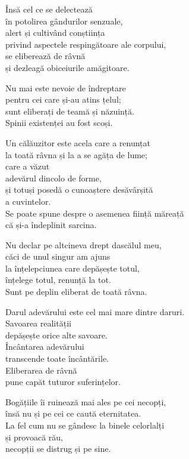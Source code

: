 Însă cel ce se delectează\\
în potolirea gândurilor senzuale,\\
alert și cultivând conștiința\\
privind aspectele respingătoare ale corpului,\\
se eliberează de râvnă\\
și dezleagă obiceiurile amăgitoare.


Nu mai este nevoie de îndreptare\\
pentru cei care și-au atins țelul;\\
sunt eliberați de teamă și năzuință.\\
Spinii existenței au fost scoși.


Un călăuzitor este acela care a renunțat\\
la toată râvna și la a se agăța de lume;\\
care a văzut\\
adevărul dincolo de forme,\\
și totuși posedă o cunoaștere desăvârșită\\
a cuvintelor.\\
Se poate spune despre o asemenea ființă măreață\\
că și-a îndeplinit sarcina.


Nu declar pe altcineva drept dascălul meu,\\
căci de unul singur am ajuns\\
la înțelepciunea care depășește totul,\\
înțelege totul, renunță la tot.\\
Sunt pe deplin eliberat de toată râvna.


Darul adevărului este cel mai mare dintre daruri.\\
Savoarea realității\\
depășește orice alte savoare.\\
Încântarea adevărului\\
transcende toate încântările.\\
Eliberarea de râvnă\\
pune capăt tuturor suferințelor.


Bogățiile îi ruinează mai ales pe cei necopți,\\
însă nu și pe cei ce caută eternitatea.\\
La fel cum nu se gândesc la binele celorlalți\\
și provoacă rău,\\
necopții se distrug și pe sine.



